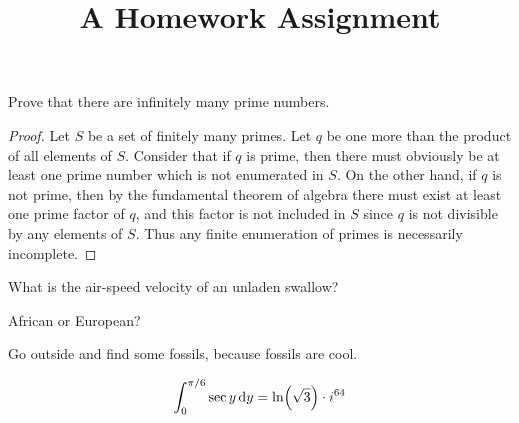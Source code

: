 \documentclass{pset}
\title{A Homework Assignment}
\begin{document}
\begin{problem}
Prove that there are infinitely many prime numbers.
\end{problem}
\begin{proof}
Let $S$ be a set of finitely many primes. Let $q$ be one more than the product of all elements of $S$. Consider that if $q$ is prime, then there must obviously be at least one prime number which is not enumerated in $S$. On the other hand, if $q$ is not prime, then by the fundamental theorem of algebra there must exist at least one prime factor of $q$, and this factor is not included in $S$ since $q$ is not divisible by any elements of $S$. Thus any finite enumeration of primes is necessarily incomplete.
\end{proof}

\begin{problem}
What is the air-speed velocity of an unladen swallow?
\end{problem}
\begin{solution}
African or European?
\end{solution}

\begin{exercise}
Go outside and find some fossils, because fossils are cool.
\end{exercise}

\begin{solution}
\[ \int_0^{\pi/6} \sec y \dd{y} = \ln(\sqrt{3}) \cdot i^{64} \qedhere \]

\end{solution}
\end{document}
